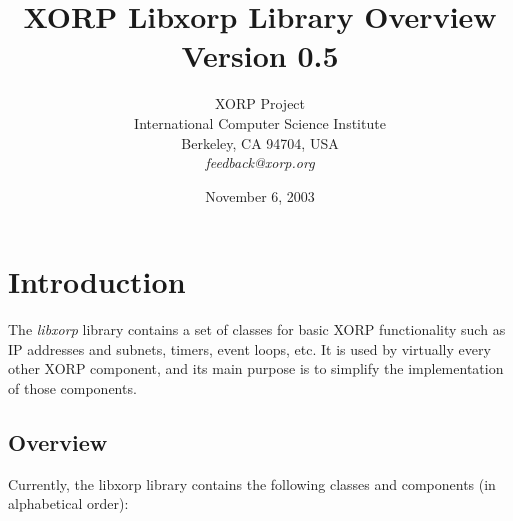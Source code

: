 \documentclass[11pt]{article}
\begin{document}
\title{XORP Libxorp Library Overview \\
\vspace{1ex}
Version 0.5}
\author{ XORP Project					\\
	 International Computer Science Institute	\\
	 Berkeley, CA 94704, USA			\\
	 {\it feedback@xorp.org}
}
\date{November 6, 2003}

\maketitle

\thispagestyle{empty}


\section{Introduction}

The \emph{libxorp} library contains a set of classes for basic
XORP functionality such as IP addresses and subnets, timers, event
loops, etc. It is used by virtually every other XORP component, and
its main purpose is to simplify the implementation of those components.

\subsection{Overview}

Currently, the libxorp library contains the following classes and
components (in alphabetical order):
\end{document}
